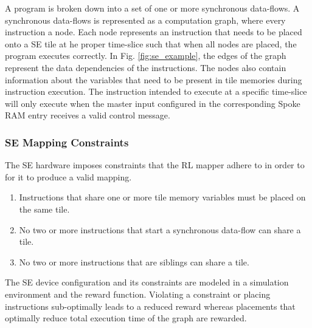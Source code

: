 A program is broken down into a set of one or more synchronous data-flows.
A synchronous data-flows is represented as a computation graph, where every instruction a node.
Each node represents an instruction that needs to be placed onto a SE tile at he proper time-slice such that when all nodes are placed, the program executes correctly. 
In Fig. \ref{fig:se_example}, the edges of the graph represent the data dependencies of the instructions. 
The nodes also contain information about the variables that need to be present in tile memories during instruction execution. 
The instruction intended to execute at a specific time-slice will only execute when the master input configured in the corresponding Spoke RAM entry receives a valid control message.

\subsubsection{SE Mapping Constraints}
The SE hardware imposes constraints that the RL mapper adhere to in order to for it to produce a valid mapping.
\begin{enumerate}
  \item Instructions that share one or more tile memory variables must be placed on the same tile.
  \item No two or more instructions that start a synchronous data-flow can share a tile.
  \item No two or more instructions that are siblings can share a tile.
\end{enumerate}
The SE device configuration and its constraints are modeled in a simulation environment and the reward function. 
Violating a constraint or placing instructions sub-optimally leads to a reduced reward whereas placements that optimally reduce total execution time of the graph are rewarded. 